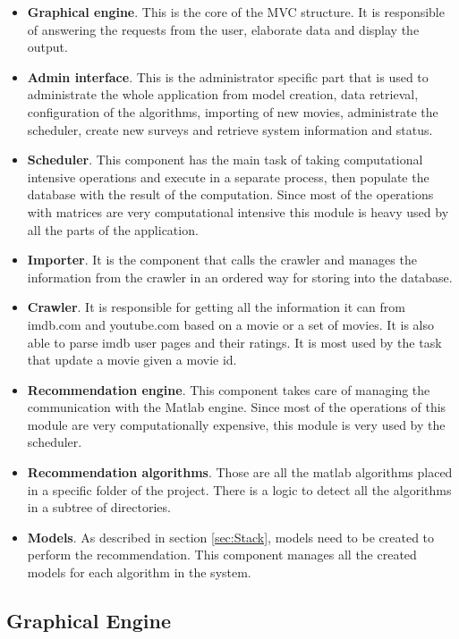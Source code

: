 \begin{itemize}
\item \textbf{Graphical engine}. This is the core of the \ac{MVC} structure. It is responsible of answering the requests from the user, elaborate data and display the output.
\item \textbf{Admin interface}. This is the administrator specific part that is used to administrate the whole application from model creation, data retrieval, configuration of the algorithms, importing of new movies, administrate the scheduler, create new surveys and retrieve system information and status.
\item \textbf{Scheduler}. This component has the main task of taking computational intensive operations and execute in a separate process, then populate the database with the result of the computation. Since most of the operations with matrices are very computational intensive this module is heavy used by all the parts of the application.
\item \textbf{Importer}. It is the component that calls the crawler and manages the information from the crawler in an ordered way for storing into the database.
\item \textbf{Crawler}. It is responsible for getting all the information it can from imdb.com and youtube.com based on a movie or a set of movies. It is also able to parse imdb user pages and their ratings. It is most used by the task that update a movie given a movie id.
\item \textbf{Recommendation engine}. This component takes care of managing the communication with the Matlab engine. Since most of the operations of this module are very computationally expensive, this module is very used by the scheduler.
\item \textbf{Recommendation algorithms}. Those are all the matlab algorithms placed in a specific folder of the project. There is a logic to detect all the algorithms in a subtree of directories.
\item \textbf{Models}. As described in section \ref{sec:Stack}, models need to be created to perform the recommendation. This component manages all the created models for each algorithm in the system.
\end{itemize}

\subsection{Graphical Engine}
\label{sec:graphical-engine}

